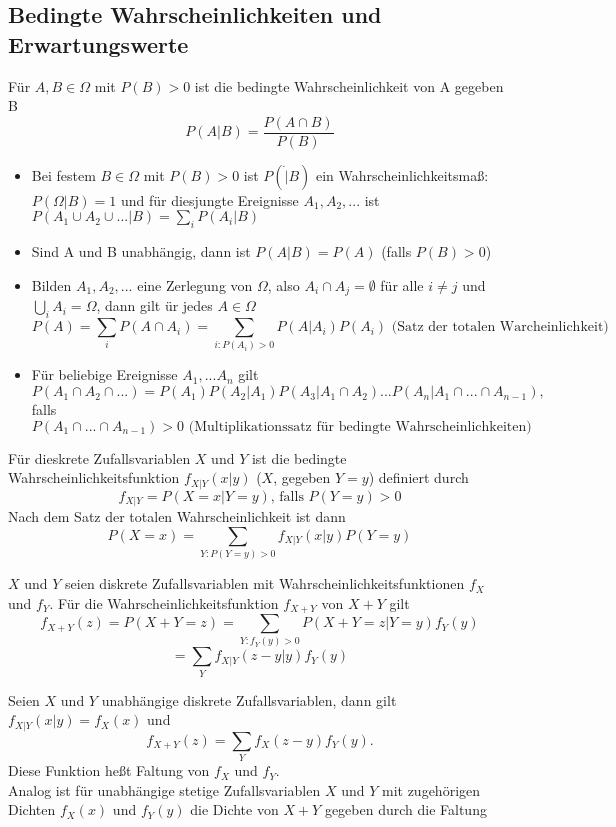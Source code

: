 \documentclass[a4paper,12pt]{article}
\begin{document}
\subsection{Bedingte Wahrscheinlichkeiten und Erwartungswerte}
Für $A,B \in \Omega $ mit $P(B)>0$ ist die bedingte Wahrscheinlichkeit von A gegeben B
$$
P(A|B) = \frac{P(A \cap B)}{P(B)}
$$
\begin{itemize}
	\item Bei festem $B\in \Omega$ mit $P(B)>0$ ist $P(\dot|B)$ ein Wahrscheinlichkeitsmaß: $P(\Omega | B) = 1$ und für diesjungte Ereignisse $A_1, A_2, ...$ ist $P(A_1 \cup A_2 \cup ... | B) = \sum_{i}P(A_i|B)$
	\item Sind A und B unabhängig, dann ist $P(A|B) = P(A)$ (falls $P(B)>0$)
	\item Bilden $A_1, A_2, ...$ eine Zerlegung von $\Omega$, also $A_i \cap A_j = \emptyset$ für alle $i \neq j$ und $\bigcup_iA_i = \Omega$, dann gilt ür jedes $A \in \Omega$
	$$P(A) = \sum_{i}P(A \cap A_i) = \sum_{i: P(A_i) > 0}P(A|A_i)P(A_i) \text{ (Satz der totalen Warcheinlichkeit) } $$
	\item Für beliebige Ereignisse $A_1, ... A_n$ gilt 
	$$
	P(A_1 \cap A_2 \cap ...) = P(A_1)P(A_2|A_1)P(A_3|A_1\cap A_2)...P(A_n | A_1 \cap ... \cap A_{n-1}), $$falls  $$ P(A_1 \cap ... \cap A_{n-1}) > 0 \text{ (Multiplikationssatz für bedingte Wahrscheinlichkeiten) }
	$$
\end{itemize}
Für dieskrete Zufallsvariablen $X$ und $Y$ ist die bedingte Wahrscheinlichkeitsfunktion $f_{X|Y}(x|y)$ ($X$, gegeben $Y=y$) definiert durch
$$
f_{X|Y} = P(X=x|Y=y) \text{, falls } P(Y=y) > 0 
$$
Nach dem Satz der totalen Wahrscheinlichkeit ist dann
$$
P(X=x) = \sum_{Y: P(Y=y)>0} f_{X|Y}(x|y)P(Y=y)
$$
\begin{tcolorbox}[breakable, colframe=blue, colback=white, title=Beispiel 1]
	$X$ und $Y$ seien diskrete Zufallsvariablen mit Wahrscheinlichkeitsfunktionen $f_X$ und $f_Y$. Für die Wahrscheinlichkeitsfunktion $f_{X+Y}$ von $X+Y$ gilt
	$$
	f_{X+Y}(z) = P(X+Y = z) = \sum_{Y: f_Y(y)>0}P(X+Y=z|Y=y)f_Y(y) $$ $$ = \sum_{Y} f_{X|Y}(z-y|y)f_Y(y)
	$$
\end{tcolorbox}
Seien $X$ und $Y$ unabhängige diskrete Zufallsvariablen, dann gilt 
$
f_{X|Y}(x|y) = f_X(x)
$ und 
$$
f_{X+Y}(z) = \sum_{Y} f_{X}(z-y)f_Y(y)
.$$
Diese Funktion heßt Faltung von $f_X$ und $f_Y$.\\
Analog ist für unabhängige stetige Zufallsvariablen $X$ und $Y$ mit zugehörigen Dichten $f_X(x)$ und $f_Y(y)$ die Dichte von $X+Y$ gegeben durch die Faltung
\end{document}
